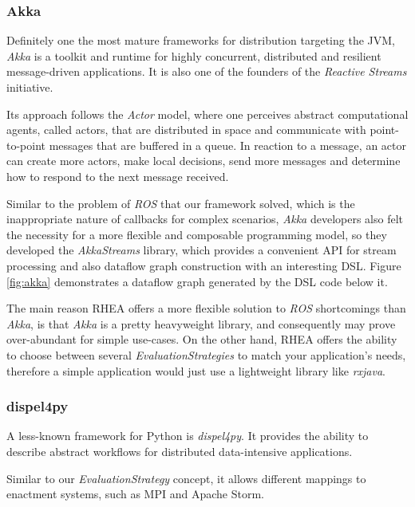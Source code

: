 \documentclass[sigplan,review,anonymous]{acmart}
\begin{document}
\subsubsection{Akka}

Definitely one the most mature frameworks for distribution targeting the JVM,
\textit{Akka} is a toolkit and runtime for highly
concurrent, distributed and resilient message-driven applications. It is also
one of the founders of the \textit{Reactive Streams}\cite{rss} initiative.

Its approach follows the \textit{Actor} model\cite{actor}, where one perceives
abstract computational agents, called actors, that are distributed in space and
communicate with point-to-point messages that are buffered in a queue. In
reaction to a message, an actor can create more actors, make local decisions,
send more messages and determine how to respond to the next message received.

Similar to the problem of \textit{ROS} that our framework solved, which is the
inappropriate nature of callbacks for complex scenarios, \textit{Akka}
developers also felt the necessity for a more flexible and composable
programming model, so they developed the \textit{AkkaStreams} library, which
provides a convenient API for stream processing and also dataflow graph
construction with an interesting DSL. Figure \ref{fig:akka} demonstrates a
dataflow graph generated by the DSL code below it.


The main reason \textsc{RHEA} offers a more flexible solution to \textit{ROS}
shortcomings than \textit{Akka}, is that \textit{Akka} is a pretty heavyweight
library, and consequently may prove over-abundant for simple use-cases. On the
other hand, \textsc{RHEA} offers the ability to choose between several
\textit{EvaluationStrategies} to match your application's needs, therefore a
simple application would just use a lightweight library like \textit{rxjava}.

\subsubsection{dispel4py}

A less-known framework for Python is
\textit{dispel4py}. It provides the ability
to describe abstract workflows for distributed data-intensive applications.

Similar to our \textit{EvaluationStrategy} concept, it allows different mappings
to enactment systems, such as MPI and Apache
Storm.
\end{document}
